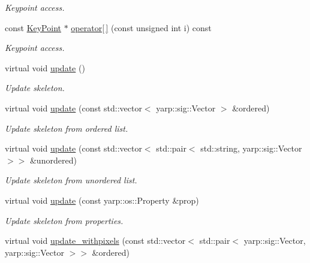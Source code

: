 \begin{DoxyCompactItemize}
\begin{DoxyCompactList}\small\item\em Keypoint access. \end{DoxyCompactList}\item 
const \hyperlink{classassistive__rehab_1_1KeyPoint}{Key\+Point} $\ast$ \hyperlink{classassistive__rehab_1_1Skeleton_a0692ab89f16b0914b9ca9e0d4a07e52c}{operator\mbox{[}$\,$\mbox{]}} (const unsigned int i) const
\begin{DoxyCompactList}\small\item\em Keypoint access. \end{DoxyCompactList}\item 
\mbox{\label{classassistive__rehab_1_1Skeleton_a1ba2ba229331f7966ff1bce10c776d99}} 
virtual void \hyperlink{classassistive__rehab_1_1Skeleton_a1ba2ba229331f7966ff1bce10c776d99}{update} ()
\begin{DoxyCompactList}\small\item\em Update skeleton. \end{DoxyCompactList}\item 
virtual void \hyperlink{classassistive__rehab_1_1Skeleton_adbb387558eac21173b7c82cb43acd603}{update} (const std\+::vector$<$ yarp\+::sig\+::\+Vector $>$ \&ordered)
\begin{DoxyCompactList}\small\item\em Update skeleton from ordered list. \end{DoxyCompactList}\item 
virtual void \hyperlink{classassistive__rehab_1_1Skeleton_ab9642d6621d0a2b189c020f4d7695b14}{update} (const std\+::vector$<$ std\+::pair$<$ std\+::string, yarp\+::sig\+::\+Vector $>$$>$ \&unordered)
\begin{DoxyCompactList}\small\item\em Update skeleton from unordered list. \end{DoxyCompactList}\item 
virtual void \hyperlink{classassistive__rehab_1_1Skeleton_ae3346b2f363e1812fdc88e59d1f7bf7d}{update} (const yarp\+::os\+::\+Property \&prop)
\begin{DoxyCompactList}\small\item\em Update skeleton from properties. \end{DoxyCompactList}\item 
virtual void \hyperlink{classassistive__rehab_1_1Skeleton_a20d9eb5aecd6dccfa7e049bb932a6cef}{update\+\_\+withpixels} (const std\+::vector$<$ std\+::pair$<$ yarp\+::sig\+::\+Vector, yarp\+::sig\+::\+Vector $>$$>$ \&ordered)

\end{DoxyCompactItemize}
